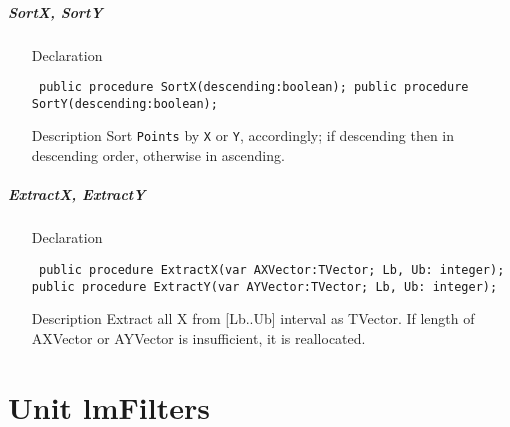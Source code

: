 \documentclass[12pt,a4paper,oneside]{report}
\newcommand{\declarationitem}[1]{{\addfontfeatures{FakeSlant} #1}}
\newcommand{\descriptiontitle}[1]{{\addfontfeatures{FakeSlant}#1}}
\newcommand{\code}[1]{\texttt{#1}}
\begin{document}
\paragraph{SortX, SortY}\hspace*{\fill}
\label{lmPointsVec.TPoints-SortX}
\begin{itemize}\item[\declarationitem{Declaration}\hfill]
	\begin{flushleft}
		\code{
			public procedure SortX(descending:boolean);
			public procedure SortY(descending:boolean);}
	\end{flushleft}
	
	\par
	\item[\descriptiontitle{Description}]
	Sort \code{Points} by \code{X} or \code{Y}, accordingly; if descending then in descending order, otherwise in ascending.
\end{itemize}
\paragraph{ExtractX, ExtractY}\hspace*{\fill}

\label{lmPointsVec.TPoints-ExtractX}
\begin{itemize}\item[\declarationitem{Declaration}\hfill]
	\begin{flushleft}
		\code{
			public procedure ExtractX(var AXVector:TVector; Lb, Ub: integer);
			public procedure ExtractY(var AYVector:TVector; Lb, Ub: integer);}
	\end{flushleft}

	\item[\descriptiontitle{Description}]
	Extract all X from [Lb..Ub] interval as TVector. If length of AXVector or AYVector is insufficient, it is reallocated. 
\end{itemize}
\chapter{Unit lmFilters}
\label{lmfilters}
\end{document}
